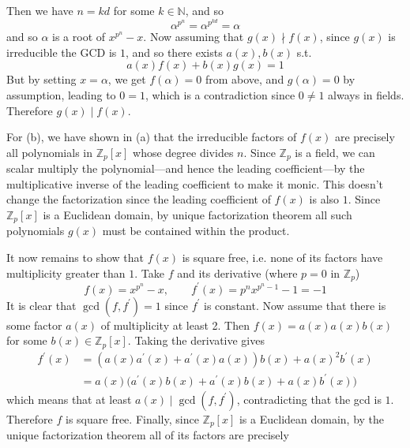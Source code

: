\begin{solution}
\begin{enumerate}
        Then we have $n = kd$ for some $k \in \mathbb{N}$, and so 
      \begin{equation}
        \alpha^{p^n} = \alpha^{p^{kd}} = \alpha
      \end{equation} 
      and so $\alpha$ is a root of $x^{p^n} - x$. Now assuming that $g(x) \nmid f(x)$, since $g(x)$ is irreducible the GCD is $1$, and so there exists $a(x), b(x)$ s.t. 
      \begin{equation}
        a(x) f(x) + b(x) g(x) = 1
      \end{equation}
      But by setting $x = \alpha$, we get $f(\alpha) = 0$ from above, and $g(\alpha) = 0$ by assumption, leading to $0 = 1$, which is a contradiction since $0 \neq 1$ always in fields. Therefore $g(x) \mid f(x)$. 
    \end{enumerate} 

    For (b), we have shown in (a) that the irreducible factors of $f(x)$ are precisely all polynomials in $\mathbb{Z}_p [x]$ whose degree divides $n$. Since $\mathbb{Z}_p$ is a field, we can scalar multiply the polynomial---and hence the leading coefficient---by the multiplicative inverse of the leading coefficient to make it monic. This doesn't change the factorization since the leading coefficient of $f(x)$ is also $1$. Since $\mathbb{Z}_p [x]$ is a Euclidean domain, by unique factorization theorem all such polynomials $g(x)$ must be contained within the product. 

    It now remains to show that $f(x)$ is square free, i.e. none of its factors have multiplicity greater than $1$. Take $f$ and its derivative (where $p = 0$ in $\mathbb{Z}_p$)
    \begin{equation}
      f(x) = x^{p^n} - x, \qquad f^\prime (x) = p^n x^{p^n - 1} - 1 = -1
    \end{equation}
    It is clear that $\gcd(f, f^\prime) = 1$ since $f^\prime$ is constant. Now assume that there is some factor $a(x)$ of multiplicity at least 2. Then $f(x) = a(x) a(x) b(x)$ for some $b(x) \in \mathbb{Z}_p [x]$. Taking the derivative gives 
    \begin{align}
      f^\prime (x) & = ( a(x) a^\prime (x) + a^\prime (x) a(x) ) b(x) + a(x)^2 b^\prime (x) \\
                   & =  a (x) \big( a^\prime (x) b(x) + a^\prime (x) b(x) + a(x) b^\prime (x) \big) 
    \end{align}
    which means that at least $a(x) \mid \gcd(f, f^\prime)$, contradicting that the gcd is $1$. Therefore $f$ is square free. Finally, since $\mathbb{Z}_p [x]$ is a Euclidean domain, by the unique factorization theorem all of its factors are precisely 
  \end{solution}
  
